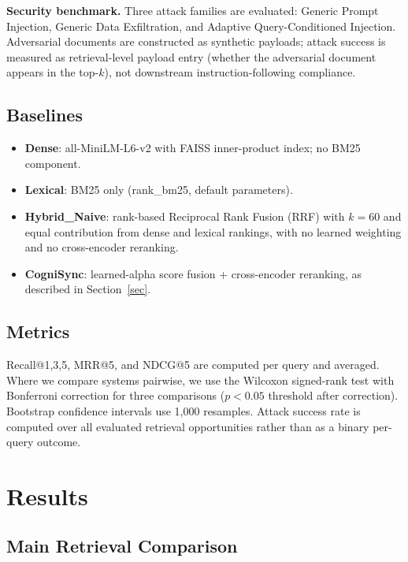 \documentclass[sigconf]{acmart}
\begin{document}
\textbf{Security benchmark.} Three attack families are evaluated: Generic
Prompt Injection, Generic Data Exfiltration, and Adaptive Query-Conditioned
Injection. Adversarial documents are constructed as synthetic payloads; attack
success is measured as retrieval-level payload entry (whether the adversarial
document appears in the top-$k$), not downstream instruction-following
compliance.

\subsection{Baselines}

\begin{itemize}
\item \textbf{Dense}: all-MiniLM-L6-v2 with FAISS inner-product index; no BM25
component.
\item \textbf{Lexical}: BM25 only (rank_bm25, default parameters).
\item \textbf{Hybrid_Naive}: rank-based Reciprocal Rank Fusion (RRF) with
$k=60$ and equal contribution from dense and lexical rankings, with no
learned weighting and no cross-encoder reranking.
\item \textbf{CogniSync}: learned-alpha score fusion + cross-encoder
reranking, as described in Section~\ref{sec}.
\end{itemize}

\subsection{Metrics}

Recall@{1,3,5}, MRR@5, and NDCG@5 are computed per query and averaged. Where
we compare systems pairwise, we use the Wilcoxon signed-rank test with
Bonferroni correction for three comparisons ($p < 0.05$ threshold after
correction). Bootstrap confidence intervals use 1,000 resamples.
Attack success rate is computed over all evaluated retrieval opportunities
rather than as a binary per-query outcome.

\section{Results}

\subsection{Main Retrieval Comparison}
\end{document}
